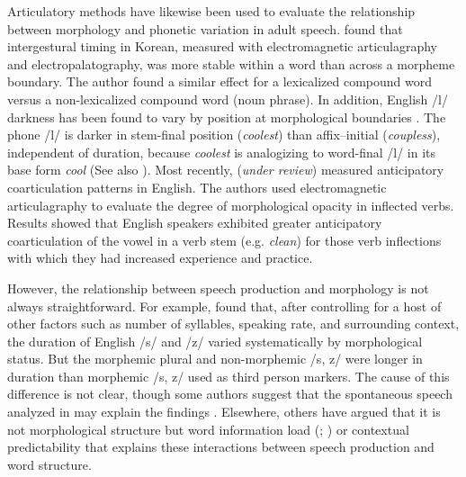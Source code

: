 \documentclass[a4paper,man,floatsintext,natbib,donotrepeattitle, apacite]{apa6}
\begin{document}
Articulatory methods have likewise been used to evaluate the relationship between morphology and phonetic variation in adult speech. \citet{choEffectsMorphemeBoundaries2001} found that intergestural timing in Korean, measured with electromagnetic articulagraphy and electropalatography, was more stable within a word than across a morpheme boundary. The author found a similar effect for a lexicalized compound word versus a non-lexicalized compound word (noun phrase). In addition, English /l/ darkness has been found to vary by position at morphological boundaries \citep{lee-kimMorphologicalEffectsDarkness2013}. The phone /l/ is darker in stem-final position (\textit{coolest}) than affix–initial (\textit{coupless}), independent of duration, because \textit{coolest} is analogizing to word-final /l/ in its base form \textit{cool} (See also \citealt{strycharczukGradualAbruptPhonetic2016}). Most recently, \citeauthor{tomaschekHowAnticipatoryCoarticulation2019} (\textit{under review}) measured anticipatory coarticulation patterns in English. The authors used electromagnetic articulagraphy to evaluate the degree of morphological opacity in inflected verbs. Results showed that English speakers exhibited greater anticipatory coarticulation of the vowel in a verb stem (e.g. \textit{clean}) for those verb inflections with which they had increased experience and practice. 

However, the relationship between speech production and morphology is not always straightforward. For example, \citet{plagHomophonyMorphologyAcoustics2017} found that, after controlling for a host of other factors such as number of syllables, speaking rate, and surrounding context, the duration of English /s/ and /z/ varied systematically by morphological status. But the morphemic plural and non-morphemic /s, z/ were longer in duration than morphemic /s, z/ used as third person markers. The cause of this difference is not clear, though some authors suggest that the spontaneous speech analyzed in \citet{plagHomophonyMorphologyAcoustics2017} may explain the findings \citep{seyfarthAcousticDifferencesMorphologicallydistinct2018}. Elsewhere, others have argued that it is not morphological structure but word information load (\citealt{haniqueRoleMorphologyAcoustic2012}; \citealt{pluymaekersMorphologicalEffectsFine2010}) or contextual predictability \citep{cohenProbabilisticReductionProbabilistic2014} that explains these interactions between speech production and word structure. 
\end{document}
